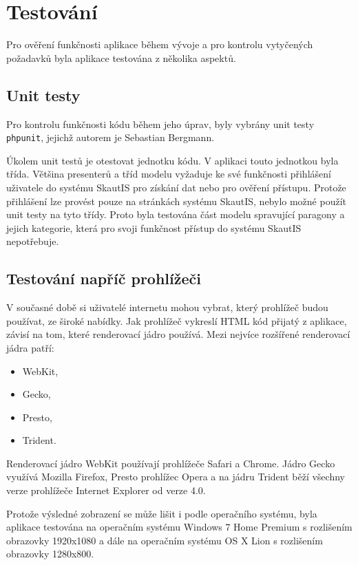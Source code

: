\documentclass[thesis=B,czech]{FITthesis}[2011/06/14]
\begin{document}
\chapter{Testování}
Pro ověření funkčnosti aplikace během vývoje a pro kontrolu vytyčených požadavků byla aplikace testována z několika aspektů.

\section{Unit testy}
Pro kontrolu funkčnosti kódu během jeho úprav, byly vybrány unit testy \texttt{phpunit}, jejichž autorem je Sebastian Bergmann\cite{phpunit}.

Úkolem unit testů je otestovat jednotku kódu. V aplikaci touto jednotkou byla třída. Většina presenterů a tříd modelu vyžaduje ke své funkčnosti přihlášení uživatele do systému SkautIS pro získání dat nebo pro ověření přístupu. Protože přihlášení lze provést pouze na stránkách systému SkautIS, nebylo možné použít unit testy na tyto třídy. Proto byla testována část modelu spravující paragony a jejich kategorie, která pro svoji funkčnost přístup do systému SkautIS nepotřebuje.

\section{Testování napříč prohlížeči}
V současné době si uživatelé internetu mohou vybrat, který prohlížeč budou používat, ze široké nabídky. Jak prohlížeč vykreslí HTML kód přijatý z aplikace, závisí na tom, které renderovací jádro používá.
Mezi nejvíce rozšířené renderovací jádra patří:
\begin{itemize}
	\item WebKit,
	\item Gecko,
	\item Presto,
	\item Trident.
\end{itemize}

Renderovací jádro WebKit používají prohlížeče Safari a Chrome. Jádro Gecko využívá Mozilla Firefox, Presto prohlížec Opera a na jádru Trident běží všechny verze prohlížeče Internet Explorer od verze 4.0.

Protože výsledné zobrazení se může lišit i podle operačního systému, byla aplikace testována na operačním systému Windows 7 Home Premium s rozlišením obrazovky 1920x1080 a dále na operačním systému OS X Lion s rozlišením obrazovky 1280x800. 
\end{document}
